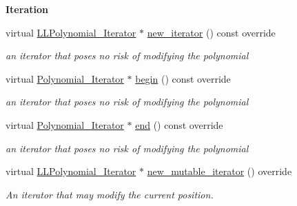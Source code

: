 \begin{Indent}\textbf{ Iteration}\par
\begin{DoxyCompactItemize}
\item 
\mbox{\label{group__polygroup_ac17e14ceb70ee8862e044ad6b44a78a5}} 
virtual \hyperlink{group___iterator_group_class_l_l_polynomial___iterator}{L\+L\+Polynomial\+\_\+\+Iterator} $\ast$ \hyperlink{group__polygroup_ac17e14ceb70ee8862e044ad6b44a78a5}{new\+\_\+iterator} () const override
\begin{DoxyCompactList}\small\item\em an iterator that poses no risk of modifying the polynomial \end{DoxyCompactList}\item 
\mbox{\label{group__polygroup_a32a8c930f367bf556b27e37c5cf0d2e7}} 
virtual \hyperlink{group___iterator_group_class_polynomial___iterator}{Polynomial\+\_\+\+Iterator} $\ast$ \hyperlink{group__polygroup_a32a8c930f367bf556b27e37c5cf0d2e7}{begin} () const override
\begin{DoxyCompactList}\small\item\em an iterator that poses no risk of modifying the polynomial \end{DoxyCompactList}\item 
\mbox{\label{group__polygroup_af38eba4370d879ae4603d3049c588d6c}} 
virtual \hyperlink{group___iterator_group_class_polynomial___iterator}{Polynomial\+\_\+\+Iterator} $\ast$ \hyperlink{group__polygroup_af38eba4370d879ae4603d3049c588d6c}{end} () const override
\begin{DoxyCompactList}\small\item\em an iterator that poses no risk of modifying the polynomial \end{DoxyCompactList}\item 
\mbox{\label{group__polygroup_a9a661c20acf3bedbecbb2acdce2598ab}} 
virtual \hyperlink{group___iterator_group_class_l_l_polynomial___iterator}{L\+L\+Polynomial\+\_\+\+Iterator} $\ast$ \hyperlink{group__polygroup_a9a661c20acf3bedbecbb2acdce2598ab}{new\+\_\+mutable\+\_\+iterator} () override
\begin{DoxyCompactList}\small\item\em An iterator that may modify the current position. \end{DoxyCompactList}\end{DoxyCompactItemize}
\end{Indent}

